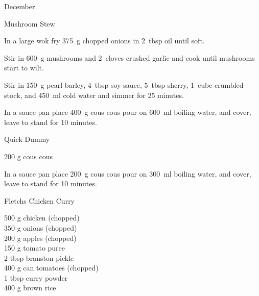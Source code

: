 \begin{menu}{December}
\begin{recipe}{2}{Mushroom Stew}
    \begin{instructions}
    \item 
        In a large wok fry
        375~g chopped onions
        in
        2~tbsp  oil
        until soft.
      \item 
        Stir in
        600~g  mushrooms
        and
        2~cloves crushed garlic
        and cook until mushrooms start to wilt.
      \item 
        Stir in
        150~g  pearl barley,
        4~tbsp  soy sauce,
        5~tbsp  sherry,
        1~cube crumbled stock,
        and
        450~ml  cold water
        and simmer for 25 minutes.
      \item 
    In a
    sauce pan 
    place
    400~g  cous cous
    pour on
    600~ml  boiling water,
    and cover, leave to stand for 10 minutes.
  
    \end{instructions}
    \end{recipe}%
  
    \begin{recipe}{1}{Quick Dummy}%
		\begin{ingredients}
		200 g cous cous  \\
	
		\end{ingredients}
	
	
    \begin{instructions}
    \item 
    In a
    sauce pan 
    place
    200~g  cous cous
    pour on
    300~ml  boiling water,
    and cover, leave to stand for 10 minutes.
  
    \end{instructions}
    \end{recipe}%
  
    \begin{recipe}{2}{Fletchs Chicken Curry}%
		\begin{ingredients}
		500 g chicken (chopped) \\
	350 g onions (chopped) \\
	200 g apples (chopped) \\
	150 g tomato puree  \\
	2 tbsp branston pickle  \\
	400 g can tomatoes (chopped) \\
	1 tbsp curry powder  \\
	400 g brown rice  \\
	

\end{ingredients}
\end{recipe}
\end{menu}
